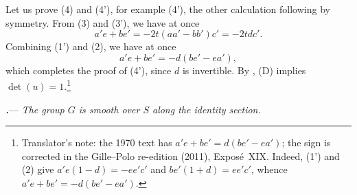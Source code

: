 Let us prove \textup{(4)} and \textup{(4')}, for example
\textup{(4')}, the other calculation following by symmetry.  From
\textup{(3)} and \textup{(3')}, we have at once
\[
  a'e+be'=-2t(aa'-bb')c'=-2tdc'.
\]
Combining \textup{(1')} and \textup{(2)}, we have at once
\[
  a'e+be'=-d(be'-ea'),
\]
which completes the proof of \textup{(4')}, since \(d\) is
invertible.  By , \textup{(D)} implies \(\det(u)=1\).\footnote{Translator's note: the 1970 text has \(a'e+be'=d(be'-ea')\); the sign is
corrected in the Gille--Polo re-edition (2011), Exposé~XIX. Indeed, (1') and
(2) give \(a'e(1-d)=-ee'c'\) and \(be'(1+d)=ee'c'\), whence
\(a'e+be'=-d(be'-ea')\).}

\par\medskip\noindent
{}\textbf{\textit{.}}---
\textit{The group \(G\) is smooth over \(S\) along the identity
section.}

